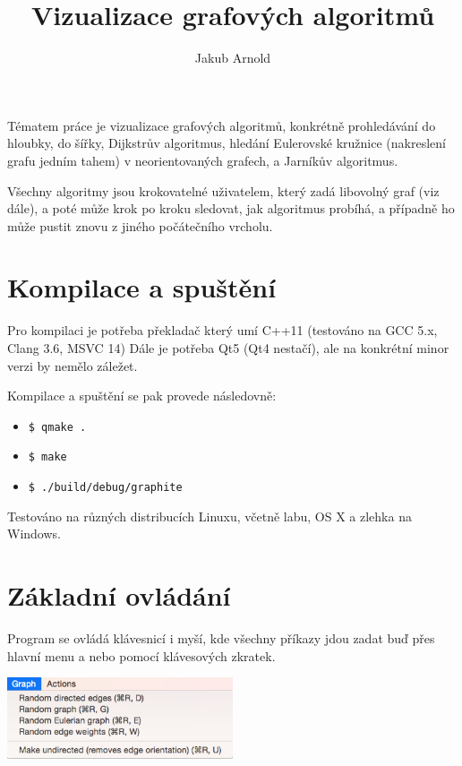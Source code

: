 \documentclass{article}
\title{Vizualizace grafových algoritmů}
\author{Jakub Arnold}
\date{}
\def\code#1{\texttt{#1}}
\begin{document}
\maketitle

Tématem práce je vizualizace grafových algoritmů, konkrétně prohledávání
do hloubky, do šířky, Dijkstrův algoritmus, hledání Eulerovské kružnice (nakreslení grafu jedním tahem)
v neorientovaných grafech, a Jarníkův algoritmus.

Všechny algoritmy jsou krokovatelné uživatelem, který zadá libovolný
graf (viz dále), a poté může krok po kroku sledovat, jak algoritmus
probíhá, a případně ho může pustit znovu z jiného počátečního vrcholu.

\section{Kompilace a spuštění}

Pro kompilaci je potřeba překladač který umí C++11 (testováno na GCC 5.x, Clang 3.6, MSVC 14)
Dále je potřeba Qt5 (Qt4 nestačí), ale na konkrétní minor verzi by nemělo záležet.

Kompilace a spuštění se pak provede následovně:

\begin{itemize}
  \item \code{\$ qmake .}
  \item \code{\$ make}
  \item \code{\$ ./build/debug/graphite}
\end{itemize}

Testováno na různých distribucích Linuxu, včetně labu, OS X a zlehka na Windows.

\pagebreak

\section{Základní ovládání}

Program se ovládá klávesnicí i myší, kde všechny příkazy jdou zadat buď
přes hlavní menu a nebo pomocí klávesových zkratek.

\begin{center}
    \includegraphics[width=0.5\textwidth]{KJaB5S6.png}
\end{center}
\end{document}
